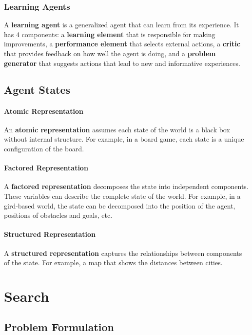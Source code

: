 \documentclass[a4paper,12pt]{article}
\begin{document}
\subsubsection{Learning Agents}

A \textbf{learning agent} is a generalized agent that can learn from its experience. It has 4 components: a \textbf{learning element} that is responsible for making improvements, a \textbf{performance element} that selects external actions, a \textbf{critic} that provides feedback on how well the agent is doing, and a \textbf{problem generator} that suggests actions that lead to new and informative experiences.

\subsection{Agent States}

\paragraph{Atomic Representation} An \textbf{atomic representation} assumes each state of the world is a black box without internal structure. For example, in a board game, each state is a unique configuration of the board.

\paragraph{Factored Representation} A \textbf{factored representation} decomposes the state into independent components. These variables can describe the complete state of the world. For example, in a gird-based world, the state can be decomposed into the position of the agent, positions of obstacles and goals, etc.

\paragraph{Structured Representation} A \textbf{structured representation} captures the relationships between components of the state. For example, a map that shows the distances between cities.

\section{Search}

\subsection{Problem Formulation}
\end{document}
